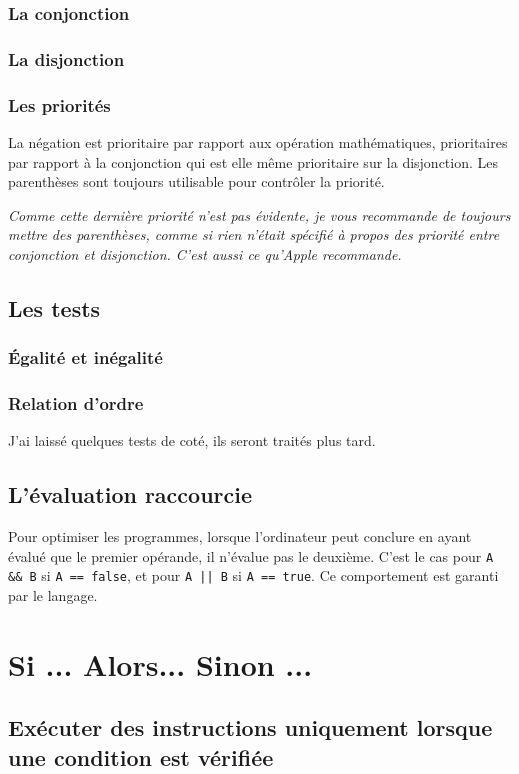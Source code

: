\subsubsection{La conjonction}
\subsubsection{La disjonction}
\subsubsection{Les priorités}
La négation est prioritaire par rapport aux opération mathématiques, prioritaires par rapport à la conjonction qui est elle même prioritaire sur la disjonction. Les parenthèses sont toujours utilisable pour contrôler la priorité.

\emph{Comme cette dernière priorité n'est pas évidente, je vous recommande de toujours mettre des parenthèses, comme si rien n'était spécifié à propos des priorité entre conjonction et disjonction. C'est aussi ce qu'\emph{Apple} recommande.}
\subsection{Les tests}
\subsubsection{Égalité et inégalité}

\subsubsection{Relation d'ordre}

J'ai laissé quelques tests de coté, ils seront traités plus tard.
\subsection{L'évaluation raccourcie}
Pour optimiser les programmes, lorsque l'ordinateur peut conclure en ayant évalué que le premier opérande, il n'évalue pas le deuxième. C'est le cas pour \texttt{A && B} si \texttt{A == false},
et pour \texttt{A || B} si \texttt{A == true}.
Ce comportement est garanti par le langage.
\section{Si ... Alors... Sinon ...}

\subsection{Exécuter des instructions uniquement lorsque une condition est vérifiée}

